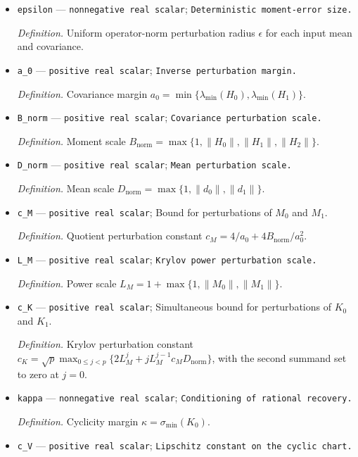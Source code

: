 \documentclass{article}
\begin{document}
\begin{itemize}
  \item \texttt{epsilon} --- \texttt{nonnegative real scalar}; \texttt{Deterministic moment-\allowbreak{}error size.}
  \par\smallskip\noindent\emph{Definition.} Uniform operator-norm perturbation radius \(\epsilon\) for each input mean and covariance.
  \item \texttt{a\_\allowbreak{}0} --- \texttt{positive real scalar}; \texttt{Inverse perturbation margin.}
  \par\smallskip\noindent\emph{Definition.} Covariance margin \(a_0=\min\{\lambda_{\min}(H_0),\lambda_{\min}(H_1)\}\).
  \item \texttt{B\_\allowbreak{}norm} --- \texttt{positive real scalar}; \texttt{Covariance perturbation scale.}
  \par\smallskip\noindent\emph{Definition.} Moment scale \(B_{\mathrm{norm}}=\max\{1,\lVert H_0\rVert,\lVert H_1\rVert,\lVert H_2\rVert\}\).
  \item \texttt{D\_\allowbreak{}norm} --- \texttt{positive real scalar}; \texttt{Mean perturbation scale.}
  \par\smallskip\noindent\emph{Definition.} Mean scale \(D_{\mathrm{norm}}=\max\{1,\lVert d_0\rVert,\lVert d_1\rVert\}\).
  \item \texttt{c\_\allowbreak{}M} --- \texttt{positive real scalar}; Bound for perturbations of \(M_0\) and \(M_1\).
  \par\smallskip\noindent\emph{Definition.} Quotient perturbation constant \(c_M=4/a_0+4B_{\mathrm{norm}}/a_0^2\).
  \item \texttt{L\_\allowbreak{}M} --- \texttt{positive real scalar}; \texttt{Krylov power perturbation scale.}
  \par\smallskip\noindent\emph{Definition.} Power scale \(L_M=1+\max\{1,\lVert M_0\rVert,\lVert M_1\rVert\}\).
  \item \texttt{c\_\allowbreak{}K} --- \texttt{positive real scalar}; Simultaneous bound for perturbations of \(K_0\) and \(K_1\).
  \par\smallskip\noindent\emph{Definition.} Krylov perturbation constant \(c_K=\sqrt p\max_{0\le j<p}\{2L_M^j+jL_M^{j-1}c_MD_{\mathrm{norm}}\}\), with the second summand set to zero at \(j=0\).
  \item \texttt{kappa} --- \texttt{nonnegative real scalar}; \texttt{Conditioning of rational recovery.}
  \par\smallskip\noindent\emph{Definition.} Cyclicity margin \(\kappa=\sigma_{\min}(K_0)\).
  \item \texttt{c\_\allowbreak{}V} --- \texttt{positive real scalar}; \texttt{Lipschitz constant on the cyclic chart.}

\end{itemize}
\end{document}
